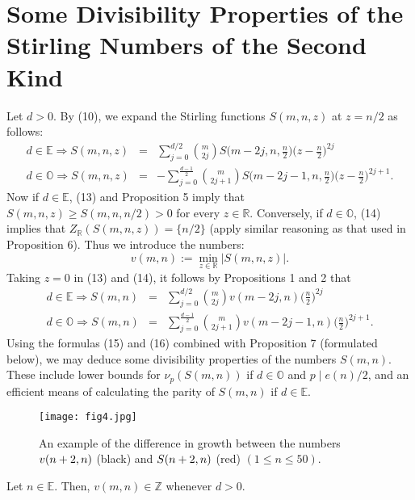 \documentclass[]{amsart}
\begin{document}
\section{Some Divisibility Properties of the Stirling Numbers of the Second Kind}
Let $d > 0$.  By (10), we expand the Stirling functions $S(m,n,z)$ at $z = n/2$ as follows:
\begin{eqnarray}
d \in \mathbb{E} \Rightarrow S(m,n,z) & = & \sum_{j=0}^{d/2}{m \choose 2j}S\bigg(m-2j,n,\frac{n}{2}\bigg)\bigg(z - \frac{n}{2}\bigg)^{2j}  \\ 
d \in \mathbb{O} \Rightarrow S(m,n,z) & = & -\sum_{j=0}^{\frac{d-1}{2}}{m \choose 2j + 1}S\bigg(m-2j-1,n,\frac{n}{2}\bigg)\bigg(z - \frac{n}{2}\bigg)^{2j+1}. 
\end{eqnarray}
Now if $d \in \mathbb{E}$, (13) and Proposition 5 imply that $S(m,n,z) \geq S(m,n,n/2) > 0$ for every $z \in \mathbb{R}$.  Conversely, if $d \in \mathbb{O}$, (14) implies that $Z_{\mathbb{R}}(S(m,n,z)) = \{n/2\}$ (apply similar reasoning as that used in Proposition 6).  Thus we introduce the numbers:
\[ v(m,n) := \min_{z \in \mathbb{R}}|S(m,n,z)|. \]
Taking $z=0$ in (13) and (14), it follows by Propositions 1 and 2 that
\begin{eqnarray}
d \in \mathbb{E} \Rightarrow S(m,n) & = & \sum_{j=0}^{d/2}{m \choose 2j}v(m-2j,n)\bigg(\frac{n}{2}\bigg)^{2j}  \\
d \in \mathbb{O} \Rightarrow S(m,n) & = & \sum_{j=0}^{\frac{d-1}{2}}{m \choose 2j + 1}v(m-2j-1,n)\bigg(\frac{n}{2}\bigg)^{2j+1}.
\end{eqnarray}
Using the formulas (15) and (16) combined with Proposition 7 (formulated below), we may deduce some divisibility properties of the numbers $S(m,n)$.  These include lower bounds for $\nu_{p}(S(m,n))$ if $d \in \mathbb{O}$ and $p \mid e(n)/2$, and an efficient means of calculating the parity of $S(m,n)$ if $d \in \mathbb{E}$.
\begin{figure}[H]
\centering
\texttt{[image: fig4.jpg]}
\caption{An example of the difference in growth between the numbers $\protect v(n+2,n)$ (black) and $\protect S(n+2,n)$ (red) $(1 \leq n \leq 50)$.}
\end{figure}
\begin{prop}
Let $n \in \mathbb{E}$.  Then, $v(m,n) \in \mathbb{Z}$ whenever $d > 0$.
\end{prop}
\end{document}
